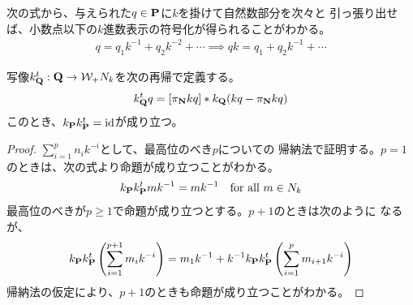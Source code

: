 	次の式から、与えられた$q\in{{\ensuremath{\mathbf{P}}}}$に$k$を掛けて自然数部分を次々と
	引っ張り出せば、小数点以下の$k$進数表示の符号化が得られることがわかる。
	\begin{equation*}\begin{split}
		q = q_1k^{-1} + q_2k^{-2} + \cdots
		\implies qk = q_1 + q_2k^{-1} + \cdots
	\end{split}\end{equation*}

	\begin{proposition}[有理数のk進数表示のエンコード]
	\label{prop:有理数のk進数表示のエンコード} %
		写像$k_{\mathbf{Q}}^t:\mathbf{Q}\to{\ensuremath{{\mathcal{W}}}}_+ N_k$を次の再帰で定義する。
		\begin{equation*}\begin{split}
			k_{\mathbf{Q}}^tq = [\pi_{\mathbf{N}} kq] * k_{\mathbf{Q}}(kq - \pi_{\mathbf{N}} kq)
		\end{split}\end{equation*}
		このとき、$k_{{\mathbf{P}}} k_{{\mathbf{P}}}^t={\operatorname{id}}$が成り立つ。
	\end{proposition} %
	\begin{proof} $\sum_{i=1}^pn_ik^{-i}$として、最高位のべき$p$についての
	帰納法で証明する。$p=1$のときは、次の式より命題が成り立つことがわかる。
	\begin{equation*}\begin{split}
		k_{{\mathbf{P}}} k_{{\mathbf{P}}}^t mk^{-1} = mk^{-1} \quad\text{for all }m\in N_k
	\end{split}\end{equation*}
	最高位のべきが$p\ge1$で命題が成り立つとする。$p+1$のときは次のように
	なるが、
	\begin{equation*}\begin{split}
		k_{{\mathbf{P}}} k_{{\mathbf{P}}}^t \left(\sum_{i=1}^{p+1}m_ik^{-i}\right)
		= m_1k^{-1} + k^{-1}k_{{\mathbf{P}}} k_{{\mathbf{P}}}^t \left(\sum_{i=1}^pm_{i+1}k^{-i}\right)
	\end{split}\end{equation*}
	帰納法の仮定により、$p+1$のときも命題が成り立つことがわかる。
	\end{proof}

